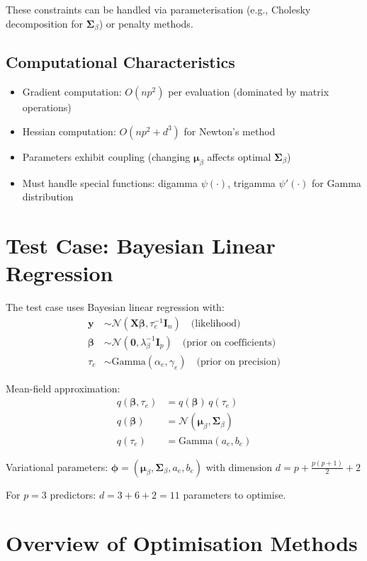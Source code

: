 \documentclass[11pt]{article}
\newcommand{\N}{\mathcal{N}}
\begin{document}
These constraints can be handled via parameterisation (e.g., Cholesky decomposition for $\bm{\Sigma}_\beta$) or penalty methods.

\subsection*{Computational Characteristics}

\begin{itemize}
\item Gradient computation: $O(np^2)$ per evaluation (dominated by matrix operations)
\item Hessian computation: $O(np^2 + d^3)$ for Newton's method
\item Parameters exhibit coupling (changing $\bm{\mu}_\beta$ affects optimal $\bm{\Sigma}_\beta$)
\item Must handle special functions: digamma $\psi(\cdot)$, trigamma $\psi'(\cdot)$ for Gamma distribution
\end{itemize}
\newpage
\section*{Test Case: Bayesian Linear Regression}

The test case uses Bayesian linear regression with:
\begin{align}
\bm{y} &\sim \N(\bm{X}\bm{\beta}, \tau_e^{-1} \bm{I}_n) \quad \text{(likelihood)}\\
\bm{\beta} &\sim \N(\bm{0}, \lambda_\beta^{-1} \bm{I}_p) \quad \text{(prior on coefficients)}\\
\tau_e &\sim \text{Gamma}(\alpha_e, \gamma_e) \quad \text{(prior on precision)}
\end{align}

Mean-field approximation:
\begin{align}
q(\bm{\beta}, \tau_e) &= q(\bm{\beta}) \, q(\tau_e)\\
q(\bm{\beta}) &= \N(\bm{\mu}_\beta, \bm{\Sigma}_\beta)\\
q(\tau_e) &= \text{Gamma}(a_e, b_e)
\end{align}

Variational parameters: $\bm{\phi} = (\bm{\mu}_\beta, \bm{\Sigma}_\beta, a_e, b_e)$ with dimension $d = p + \frac{p(p+1)}{2} + 2$

For $p=3$ predictors: $d = 3 + 6 + 2 = 11$ parameters to optimise.
 
\section*{Overview of Optimisation Methods}
\end{document}
